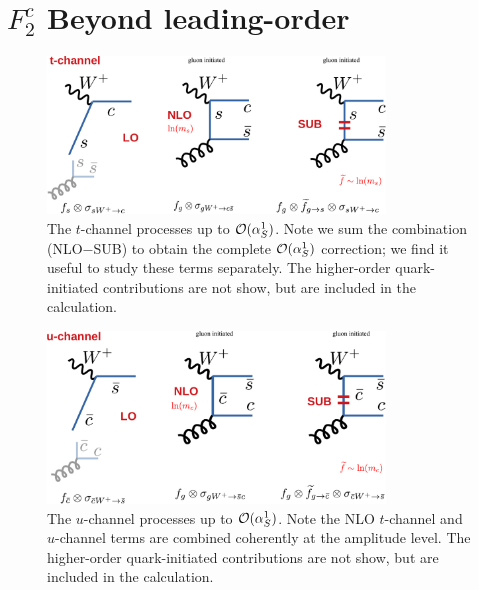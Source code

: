 \clearpage
\newcommand{\xsec}[1]{\vskip 6pt \noindent {\bf #1} \quad }
\appendix
{}

\section{$F_{2}^{c}$ Beyond leading-order}\label{sec:appendix}

\begin{figure}
  \centering \includegraphics[clip,width=0.8\textwidth]{pics/fred/tchannel}
  \caption{The $t$-channel processes up to ${\cal  O}(\alpha_S^1)$.
Note we sum the combination (NLO$-$SUB) to obtain the complete ${\cal  O}(\alpha_S^1)$ correction;
we find it useful to study these terms separately.
The higher-order quark-initiated contributions are not show, but are included in the calculation. 
\label{fig:tchannel}}
\end{figure}

\begin{figure}
  \centering \includegraphics[clip,width=0.8\textwidth]{pics/fred/uchannel}
\caption{The $u$-channel processes  up to ${\cal  O}(\alpha_S^1)$.
Note the NLO  $t$-channel and $u$-channel terms are combined coherently at the amplitude  level. 
The higher-order quark-initiated contributions are not show, but are included in the calculation. 
\label{fig:uchannel}}
\end{figure}


